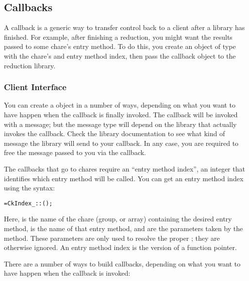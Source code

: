 \subsection{Callbacks}

\label{callbacks}

A callback is a generic way to transfer control back to a client
after a \charmpp{} library has finished.  For example, after finishing a reduction,
you might want the results passed to some chare's entry method.
To do this, you create an object of type  with
the chare's  and entry method index, then pass the
callback object to the reduction library.


\subsubsection{Client Interface}


You can create a  object in a number of ways,
depending on what you want to have happen when the callback is
finally invoked.  The callback will be invoked with a \charmpp{}
message; but the message type will depend on the \charmpp{} library that 
actually invokes the callback.  Check the library documentation
to see what kind of message the library will send to your callback.
In any case, you are required to free the message passed to you via
the callback.

The callbacks that go to chares require an ``entry method index'',
an integer that identifies which entry method will be called.
You can get an entry method index using the syntax:

\begin{alltt}
=CkIndex_::();
\end{alltt}

Here,  is the name of the chare (group, or array) containing
the desired entry method,  is the name of that entry method,
and  are the parameters taken by the method.
These parameters are only used to resolve the proper ;
they are otherwise ignored.  An entry method index is the \charmpp{}
version of a function pointer.


There are a number of ways to build callbacks, depending on what you
want to have happen when the callback is invoked:

